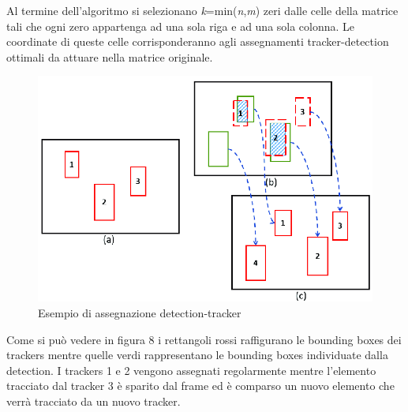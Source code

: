 Al termine dell'algoritmo si selezionano \textit{k}=min(\textit{n},\textit{m}) zeri dalle celle della matrice tali che ogni zero appartenga ad una sola riga e ad una sola colonna. Le coordinate di queste celle corrisponderanno agli assegnamenti tracker-detection ottimali da attuare nella matrice originale.
\begin{figure}[H]
	\centering
	\includegraphics[width=0.7\linewidth]{images/detection-tracker-assignment.png}
	\caption{Esempio di assegnazione detection-tracker}
	\label{Esempio di assegnazione detection-tracker}
\end{figure}
Come si può vedere in figura 8 i rettangoli rossi raffigurano le bounding boxes dei trackers mentre quelle verdi rappresentano le bounding boxes individuate dalla detection. I trackers 1 e 2 vengono assegnati regolarmente mentre l'elemento tracciato dal tracker 3 è sparito dal frame ed è comparso un nuovo elemento che verrà tracciato da un nuovo tracker.
